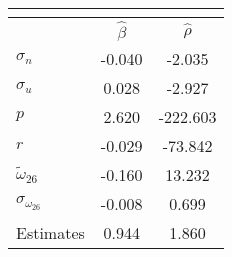 \begin{tabular}{l*{2}{c}} 
\multicolumn{3}{c}{} \\ \toprule 
& $\hat{\beta}$ & $\hat{\rho}$ \\ \cmidrule(lr){2-3} 
  $\sigma_{n}$ & -0.040 & -2.035 \\ 
  $\sigma_{u}$ & 0.028 & -2.927 \\ 
  $p$ & 2.620 & -222.603 \\ 
  $r$ & -0.029 & -73.842 \\ 
  $\tilde{\omega}_{26}$ & -0.160 & 13.232 \\ 
  $\sigma_{\omega_{26}}$ & -0.008 & 0.699 \\ 
 \midrule Estimates& 0.944 & 1.860 \\ \bottomrule 
 \end{tabular}